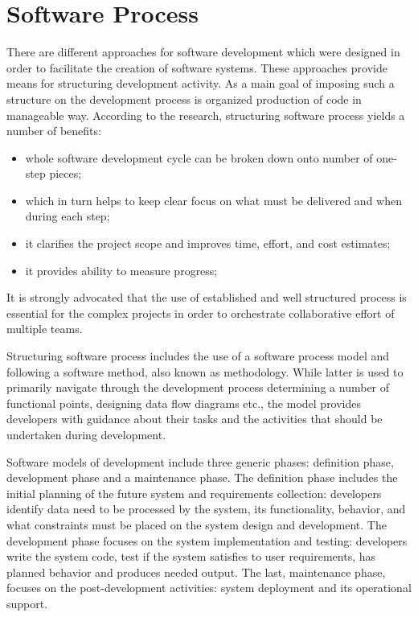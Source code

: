 \chapter{Software Process}
There are different approaches for software development which were designed in order to 
facilitate the creation of software systems. These approaches provide means for 
structuring development activity. As a main goal of imposing such a structure on the 
development process is organized production of code in manageable way. 
According to the research, structuring software process yields a number of benefits:
\begin{itemize}
 \item whole software development cycle can be broken down onto number of one-step pieces;
 \item which in turn helps to keep clear focus on what must be delivered and when during each step;
 \item it clarifies the project scope and improves time, effort, and cost estimates;
 \item it provides ability to measure progress;
\end{itemize}
It is strongly advocated that the use of established and well structured process is 
essential for the complex projects in order to orchestrate collaborative effort 
of multiple teams. 

Structuring software process includes the use of a software process model and following 
a software method, also known as methodology. While latter is used to primarily navigate 
through the development process determining a number of functional points, 
designing data flow diagrams etc., the model provides developers with guidance about their 
tasks and the activities that should be undertaken during development. 

Software models of development include three generic phases: definition phase, 
development phase and a maintenance phase. 
The definition phase includes the initial planning of the future system and 
requirements collection: developers identify data need to be processed by the system, 
its functionality, behavior, and what constraints must be placed on the system design 
and development. 
The development phase focuses on the system implementation and testing: developers 
write the system code, test if the system satisfies to user requirements, 
has planned behavior and produces needed output. 
The last, maintenance phase, focuses on the post-development activities: 
system deployment and its operational support. 

